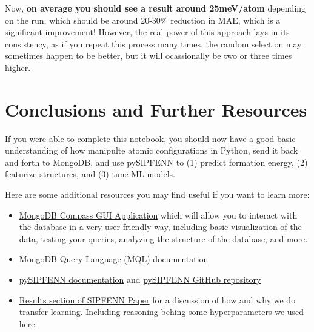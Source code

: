 Now, \textbf{on average you should see a result around 25meV/atom}
depending on the run, which should be around 20-30\% reduction in MAE,
which is a significant improvement! However, the real power of this
approach lays in its consistency, as if you repeat this process many
times, the random selection may sometimes happen to be better, but it
will ocassionally be two or three times higher.

\hypertarget{conclusions-and-further-resources}{%
\section{Conclusions and Further
Resources}\label{pysipfenntutorial2:conclusions-and-further-resources}}

If you were able to complete this notebook, you should now have a good
basic understanding of how manipulte atomic configurations in Python,
send it back and forth to MongoDB, and use pySIPFENN to (1) predict
formation energy, (2) featurize structures, and (3) tune ML models.

Here are some additional resources you may find useful if you want to
learn more:

\begin{itemize}
\item
  \href{https://www.mongodb.com/try/download/compass}{MongoDB Compass
  GUI Application} which will allow you to interact with the database in
  a very user-friendly way, including basic visualization of the data,
  testing your queries, analyzing the structure of the database, and
  more.
\item
  \href{https://docs.mongodb.com/manual/tutorial/query-documents/}{MongoDB
  Query Language (MQL) documentation}
\item
  \href{https://pysipfenn.org}{pySIPFENN documentation} and
  \href{https://git.pysipfenn.org}{pySIPFENN GitHub repository}
\item
  \href{https://www.sciencedirect.com/science/article/pii/S0927025622000593?via\%3Dihub\#sec3}{Results
  section of SIPFENN Paper} for a discussion of how and why we do
  transfer learning. Including reasoning behing some hyperparameters we
  used here.
\end{itemize}
